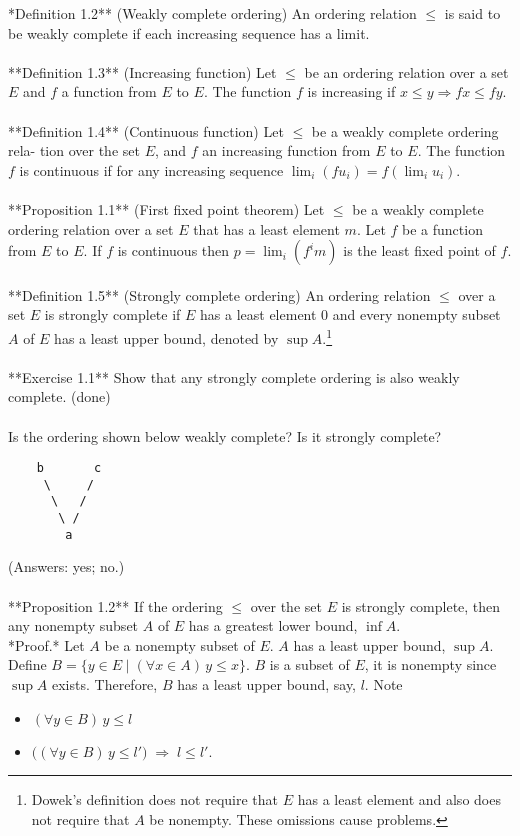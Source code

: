 \noindent **Definition 1.2** (Weakly complete ordering) An ordering relation $\leq$ is said to be
weakly complete if each increasing sequence has a limit.\\
\\
**Definition 1.3** (Increasing function) Let $\leq$ be an ordering relation over
a set $E$ and $f$ a function from $E$ to $E$. The function $f$ is increasing if
$x \leq y \Rightarrow f x \leq fy$. \\
\\
**Definition 1.4** (Continuous function) Let $\leq$ be a weakly complete ordering rela-
tion over the set $E$, and $f$ an increasing function from $E$ to $E$. The function $f$ is
continuous if for any increasing sequence $\lim_i (f u_i ) = f (\lim_i u_i )$.\\
\\
**Proposition 1.1** (First fixed point theorem) Let $\leq$ be a weakly complete ordering
relation over a set $E$ that has a least element $m$. Let $f$ be a function from 
$E$ to $E$. If $f$ is continuous then $p = \lim_i (f^i m)$ is the least fixed
point of $f$. \\
\\
**Definition 1.5** (Strongly complete ordering) An ordering relation $\leq$ over a set $E$
is strongly complete if $E$ has a least element 0 and every nonempty subset $A$ of
$E$ has a least upper bound, denoted by $\sup A$.\footnote{Dowek's definition
  does not require that $E$ has a least element and also does not require that
  $A$ be nonempty.  These omissions cause problems.} \\
\\
**Exercise 1.1** Show that any strongly complete ordering is also weakly complete.  
(done)\\
\\
Is the ordering shown below weakly complete? Is it strongly complete?  

\begin{verbatim}
    b       c
     \     /
      \   /
       \ /
        a
\end{verbatim}
(Answers: yes; no.)\\
\\
**Proposition 1.2** If the ordering $\leq$ over the set $E$ is strongly
complete, then any nonempty subset $A$ of $E$ has a greatest lower bound, $\inf A$.\\[4pt]
*Proof.* Let $A$ be a nonempty subset of $E$. $A$ has a least upper bound, 
$\sup  A$. Define $B = \{ y \in E \mid (\forall x \in A)\, y \leq x \}$. 
$B$ is a subset of $E$, it is nonempty since $\sup A$ exists. 
Therefore, $B$ has a least upper bound, say, $l$. Note
\begin{itemize}
\item $(\forall y\in B) \, y \leq l$
\item $\bigl((\forall y\in B)\, y \leq l'\bigr)\; \Rightarrow \; l \leq l'$.
\end{itemize}

